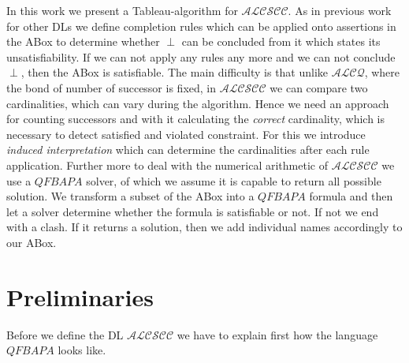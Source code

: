 \documentclass{book}
\theoremstyle{break}
\theoremstyle{definition}
\begin{document}
In this work we present a Tableau-algorithm for $\mathcal{ALCSCC}$. As in previous work for other DLs we define completion rules which can be applied onto assertions in the ABox to determine whether $\perp$ can be concluded from it which states its unsatisfiability. If we can not apply any rules any more and we can not conclude $\perp$, then the ABox is satisfiable. The main difficulty is that unlike $\mathcal{ALCQ}$, where the bond of number of successor is fixed, in $\mathcal{ALCSCC}$ we can compare two cardinalities, which can vary during the algorithm. Hence we need an approach for counting successors and with it calculating the \textit{correct} cardinality, which is necessary to detect satisfied and violated constraint. For this we introduce \textit{induced interpretation} which can determine the cardinalities after each rule application. Further more to deal with the numerical arithmetic of $\mathcal{ALCSCC}$ we use a $QFBAPA$ solver, of which we assume it is capable to return all possible solution. We transform a subset of the ABox into a $QFBAPA$ formula and then let a solver determine whether the formula is satisfiable or not. If not we end with a clash. If it returns a solution, then we add individual names accordingly to our ABox. 
\chapter{Preliminaries}
Before we define the DL $\mathcal{ALCSCC}$ we have to explain first how the language $QFBAPA$ looks like. 
\end{document}
